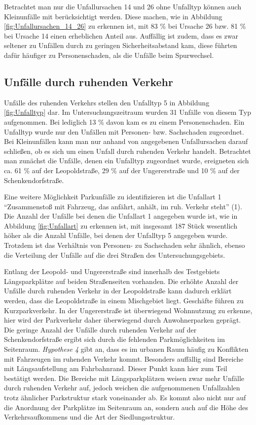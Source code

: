 Betrachtet man nur die Unfallursachen 14 und 26 ohne Unfalltyp können auch Kleinunfälle mit berücksichtigt werden. Diese machen, wie in Abbildung \ref{fig:Unfallursachen_14_26} zu erkennen ist, mit 83 \% bei Ursache 26 bzw. 81 \% bei Ursache 14 einen erheblichen Anteil aus. Auffällig ist zudem, dass es zwar seltener zu Unfällen durch zu geringen Sicherheitsabstand kam, diese führten dafür häufiger zu Personenschaden, als die Unfälle beim Spurwechsel.

\subsection{Unfälle durch ruhenden Verkehr}
Unfälle des ruhenden Verkehrs stellen den Unfalltyp 5 in Abbildung \ref{fig:Unfalltyp} dar. Im Untersuchungszeitraum wurden 31 Unfälle von diesem Typ aufgenommen. Bei lediglich 13 \% davon kam es zu einem Personenschaden. Ein Unfalltyp wurde nur den Unfällen mit Personen- bzw. Sachschaden zugeordnet. Bei Kleinunfällen kann man nur anhand von angegebenen Unfallursachen darauf schließen, ob es sich um einen Unfall durch ruhenden Verkehr handelt. Betrachtet man zunächst die Unfälle, denen ein Unfalltyp zugeordnet wurde, ereigneten sich ca. 61 \% auf der Leopoldstraße, 29 \% auf der Ungererstraße und 10 \% auf der Schenkendorfstraße. 

Eine weitere Möglichkeit Parkunfälle zu identifizieren ist die Unfallart 1 \enquote{Zusammenstoß mit Fahrzeug, das anfährt, anhält, im ruh. Verkehr steht} (1). Die Anzahl der Unfälle bei denen die Unfallart 1 angegeben wurde ist, wie in Abbildung \ref{fig:Unfallart} zu erkennen ist, mit insgesamt 187 Stück wesentlich höher als die Anzahl Unfälle, bei denen der Unfalltyp 5 angegeben wurde. Trotzdem ist das Verhältnis von Personen- zu Sachschaden sehr ähnlich, ebenso die Verteilung der Unfälle auf die drei Straßen des Untersuchungsgebiets. 

Entlang der Leopold- und Ungererstraße sind innerhalb des Testgebiets Längsparkplätze auf beiden Straßenseiten vorhanden. Die erhöhte Anzahl der Unfälle durch ruhenden Verkehr in der Leopoldstraße kann dadurch erklärt werden, dass die Leopoldstraße in einem Mischgebiet liegt. Geschäfte führen zu Kurzparkverkehr. In der Ungererstraße ist überwiegend Wohnnutzung zu erkenne, hier wird der Parkverkehr daher überwiegend durch Anwohnerparken geprägt. Die geringe Anzahl der Unfälle durch ruhenden Verkehr auf der Schenkendorfstraße ergibt sich durch die fehlenden Parkmöglichkeiten im Seitenraum. \textit{Hypothese 4} gibt an, dass es im urbanen Raum häufig zu Konflikten mit Fahrzeugen im ruhenden Verkehr kommt. Besonders auffällig sind Bereiche mit Längsaufstellung am Fahrbahnrand. Dieser Punkt kann hier zum Teil bestätigt werden. Die Bereiche mit Längsparkplätzen weisen zwar mehr Unfälle durch ruhenden Verkehr auf, jedoch weichen die aufgenommenen Unfallzahlen trotz ähnlicher Parkstruktur stark voneinander ab. Es kommt also nicht nur auf die Anordnung der Parkplätze im Seitenraum an, sondern auch auf die Höhe des Verkehrsaufkommens und die Art der Siedlungsstruktur.

